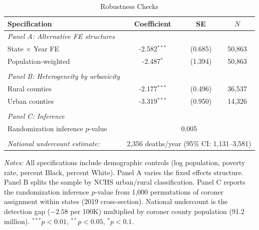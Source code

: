 \begin{table}[t]
\centering
\caption{Robustness Checks}
\label{tab:robustness}
\small
\begin{tabular}{lccc}
\hline\hline
Specification & Coefficient & SE & $N$ \\
\hline
\textit{Panel A: Alternative FE structures} & & & \\
\quad State $\times$ Year FE & -2.582$^{***}$ & (0.685) & 50,863 \\
\quad Population-weighted & -2.487$^{*}$ & (1.394) & 50,863 \\
 & & & \\
\textit{Panel B: Heterogeneity by urbanicity} & & & \\
\quad Rural counties & -2.177$^{***}$ & (0.496) & 36,537 \\
\quad Urban counties & -3.319$^{***}$ & (0.950) & 14,326 \\
 & & & \\
\textit{Panel C: Inference} & & & \\
\quad Randomization inference $p$-value & \multicolumn{3}{c}{0.005} \\
\hline
 & & & \\
\textit{National undercount estimate:} & \multicolumn{3}{c}{2,356 deaths/year (95\% CI: 1,131--3,581)} \\
\hline\hline
\end{tabular}
\begin{tablenotes}
\item \textit{Notes:} All specifications include demographic controls (log population, poverty rate, percent Black, percent White). Panel A varies the fixed effects structure. Panel B splits the sample by NCHS urban/rural classification. Panel C reports the randomization inference $p$-value from 1,000 permutations of coroner assignment within states (2019 cross-section). National undercount is the detection gap ($-2.58$ per 100K) multiplied by coroner county population (91.2 million). $^{***}p<0.01$, $^{**}p<0.05$, $^{*}p<0.1$.
\end{tablenotes}
\end{table}
